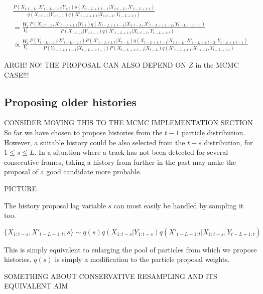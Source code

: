 \begin{multline}
\frac{ P(X_{1:t-L}, X'_{t-L+1:t}|Y_{1:t}) \rho(X_{t-L+1:t-1}|X_{1:t-L}, X'_{t-L+1:t}) }{ q(X_{1:t-1}|Y_{1:t-1}) q(X'_{t-L+1:t}|X_{1:t-1}, Y_{t-L+1:t}) } \\
= \frac{W_t}{V_t} \frac{ P(X_{1:t-L}, X'_{t-L+1:t}|Y_{1:t}) q(X_{t-L+1:t-1}|X_{1:t-L}, X'_{t-L+1:t-2}, Y_{t-L+1:t-1}) }{ P(X_{1:t-1}|Y_{1:t-1}) q(X'_{t-L+1:t}|X_{1:t-1}, Y_{t-L+1:t}) } \\
\propto \frac{W_t}{V_t} \frac{ P(Y_{t-L+1:t}|X'_{t-L+1:t}) P(X'_{t-L+1:t}|X_{t-L}) q(X_{t-L+1:t-1}|X_{1:t-L}, X'_{t-L+1:t-2}, Y_{t-L+1:t-1}) }{ P(Y_{t-L+1:t-1}|X_{t-L+1:t-1}) P(X_{t-L+1:t-1}|X_{t-L}) q(X'_{t-L+1:t}|X_{1:t-1}, Y_{t-L+1:t}) }
\label{eq:}
\end{multline}

ARGH! NO! THE PROPOSAL CAN ALSO DEPEND ON $Z$ in the MCMC CASE!!!





\subsection{Proposing older histories}
CONSIDER MOVING THIS TO THE MCMC IMPLEMENTATION SECTION
So far we have chosen to propose histories from the $t-1$ particle distribution. However, a suitable history could be also selected from the $t-s$ distribution, for $1 \le s \le L$. In a situation where a track has not been detected for several consecutive frames, taking a history from further in the past may make the proposal of a good candidate more probable.

PICTURE

The history proposal lag variable $s$ can most easily be handled by sampling it too.

\begin{equation}
\{X_{1:t-s}, X'_{t-L+1:t}, s\} \sim q(s) q(X_{1:t-s}|Y_{1:t-s}) q(X'_{t-L+1:t}|X_{1:t-s}, Y_{t-L+1:t})
\label{eq:ExtendedFLProposal}
\end{equation}

This is simply equivalent to enlarging the pool of particles from which we propose histories. $q(s)$ is simply a modification to the particle proposal weights.

SOMETHING ABOUT CONSERVATIVE RESAMPLING AND ITS EQUIVALENT AIM
